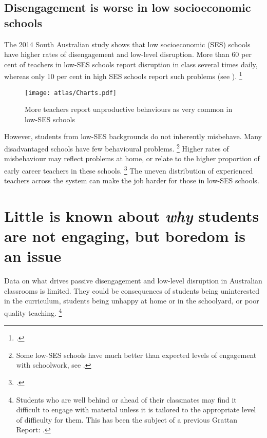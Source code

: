 \documentclass[FrontPage]{grattan}
\begin{document}
\subsection{Disengagement is worse in low socioeconomic schools}\label{subsec:low-engagement-higher}

The 2014 South Australian study shows that low socioeconomic (SES) schools have higher rates of disengagement and low-level disruption. More than 60 per cent of teachers in low-SES schools report disruption in class several times daily, whereas only 10 per cent in high SES schools report such problems (see ).
    \footcite{Sullivan2014PunishThemEngage}

\begin{figure}
\caption{More teachers report unproductive behaviours as very common in low-SES schools\label{fig:unproductive-behaviours-low-SES}}%
\texttt{[image: atlas/Charts.pdf]}
\end{figure}

However, students from low-SES backgrounds do not inherently misbehave. Many disadvantaged schools have few behavioural problems.%
    \footnote{Some low-SES schools have much better than expected levels of engagement with schoolwork, see \textcite{Angus2009PipelineProject}.}
Higher rates of misbehaviour may reflect problems at home, or relate to the higher proportion of early career teachers in these schools.%
    \footcite{Freeman2014AustralianTeachersLearning} 
The uneven distribution of experienced teachers across the system can make the job harder for those in low-SES schools.

\section{Little is known about \emph{why} students are not engaging, but boredom is an issue}\label{sec:little-known-about-why}
Data on what drives passive disengagement and low-level disruption in Australian classrooms is limited. They could be consequences of students being uninterested in the curriculum, students being unhappy at home or in the schoolyard, or poor quality teaching.%
    \footnote{Students who are well behind or ahead of their classmates may find it difficult to engage with material unless it is tailored to the appropriate level of difficulty for them.
    This has been the subject of a previous Grattan Report: \textcite{Goss2015TargetedTeachingHow}.}
 
\end{document}
